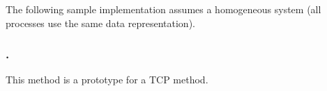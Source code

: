 

The following sample implementation assumes a homogeneous system (all
processes use the same data representation).  

\subsubsection{\tcpname.}
This method is a prototype for a TCP method.  

